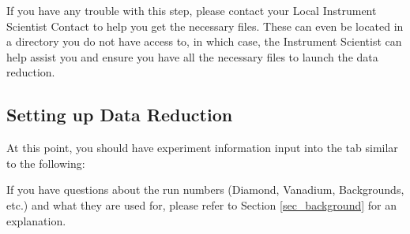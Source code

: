   \noindent{}
  
  If you have any trouble with this step, please contact your Local Instrument Scientist Contact to help you get the necessary files. These can even be located in a directory you do not have access to, in which case, the Instrument Scientist can help assist you and ensure you have all the necessary files to launch the data reduction.
  

  
\subsection{Setting up Data Reduction}

At this point, you should have experiment information input into the tab similar to the following:

  \noindent{}
  
  
If you have questions about the run numbers (Diamond, Vanadium, Backgrounds, etc.) and what they are used for, please refer to Section \ref{sec_background} for an explanation. 

